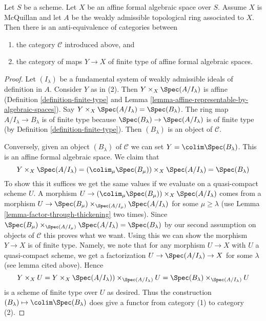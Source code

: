 \begin{lemma}
\label{lemma-category-affine-over}
Let $S$ be a scheme. Let $X$ be an affine formal algebraic space over $S$.
Assume $X$ is McQuillan and let $A$ be the weakly admissible topological
ring associated to $X$. Then there is an anti-equivalence of categories
between
\begin{enumerate}
\item the category $\mathcal{C}$ introduced above, and
\item the category of maps $Y \to X$ of finite type of
affine formal algebraic spaces.
\end{enumerate}
\end{lemma}

\begin{proof}
Let $(I_\lambda)$ be a fundamental system of weakly admissible ideals
of definition in $A$. Consider $Y$ as in (2). Then
$Y \times_X \Spec(A/I_\lambda)$ is affine
(Definition \ref{definition-finite-type}
and Lemma \ref{lemma-affine-representable-by-algebraic-spaces}).
Say $Y \times_X \Spec(A/I_\lambda) = \Spec(B_\lambda)$.
The ring map $A/I_\lambda \to B_\lambda$ is of finite type
because $\Spec(B_\lambda) \to \Spec(A/I_\lambda)$ is of
finite type
(by Definition \ref{definition-finite-type}).
Then $(B_\lambda)$ is an object of $\mathcal{C}$.

\medskip\noindent
Conversely, given an object $(B_\lambda)$ of $\mathcal{C}$ we can set
$Y = \colim \Spec(B_\lambda)$. This is an affine formal algebraic
space. We claim that
$$
Y \times_X \Spec(A/I_\lambda) =
\left(\colim_\mu \Spec(B_\mu)\right) \times_X \Spec(A/I_\lambda) =
\Spec(B_\lambda)
$$
To show this it suffices we get the same values if we evaluate
on a quasi-compact scheme $U$. A morphism
$U \to \left(\colim_\mu \Spec(B_\mu)\right) \times_X \Spec(A/I_\lambda)$
comes from a morphism
$U \to \Spec(B_\mu) \times_{\Spec(A/I_\mu)} \Spec(A/I_\lambda)$
for some $\mu \geq \lambda$ (use
Lemma \ref{lemma-factor-through-thickening} two times). Since
$\Spec(B_\mu) \times_{\Spec(A/I_\mu)} \Spec(A/I_\lambda) = \Spec(B_\lambda)$
by our second assumption on objects of $\mathcal{C}$
this proves what we want. Using this we can show the morphism
$Y \to X$ is of finite type. Namely, we note that
for any morphism $U \to X$ with $U$ a quasi-compact scheme, we get
a factorization $U \to \Spec(A/I_\lambda) \to X$ for some $\lambda$
(see lemma cited above). Hence
$$
Y \times_X U =
Y \times_X \Spec(A/I_\lambda)) \times_{\Spec(A/I_\lambda)} U =
\Spec(B_\lambda) \times_{\Spec(A/I_\lambda)} U
$$
is a scheme of finite type over $U$ as desired. Thus the construction
$(B_\lambda) \mapsto \colim \Spec(B_\lambda)$ does give a functor
from category (1) to category (2).


\end{proof}
